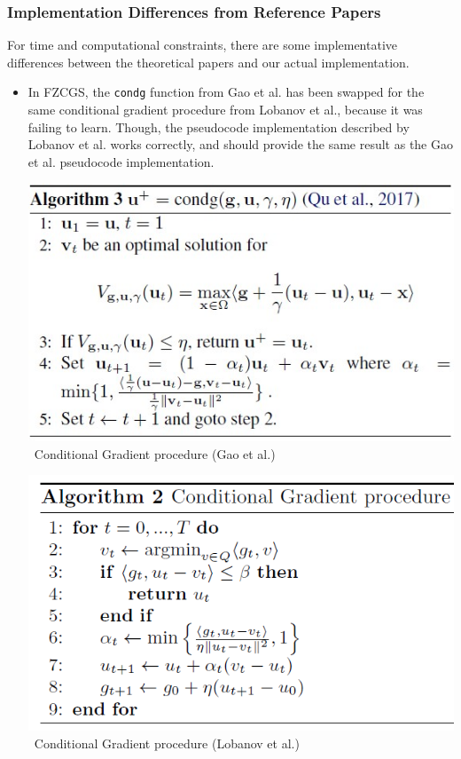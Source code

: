 \documentclass[10pt,twocolumn,letterpaper]{article}
\begin{document}
\subsubsection{Implementation Differences from Reference Papers}

For time and computational constraints, there are some implementative differences 
between the theoretical papers and our actual implementation.

\begin{itemize}
   \item In FZCGS, the \texttt{condg} function from Gao et al. has been swapped
   for the same conditional gradient procedure from Lobanov et al., because it
   was failing to learn. Though, the pseudocode implementation described by Lobanov et al. works
   correctly, and should provide the same result as the Gao et al. pseudocode implementation.

   \begin{center}
      \includegraphics*[scale=0.6]{img/condg_pseudocode.jpg}\newline
      \
      \small{Conditional Gradient procedure (Gao et al.)}
   \end{center}

   \begin{center}
      \includegraphics*[scale=0.55]{img/condg_lobanov.png}\newline
      \
      \small{Conditional Gradient procedure (Lobanov et al.)}
   \end{center}


\end{itemize}
\end{document}
